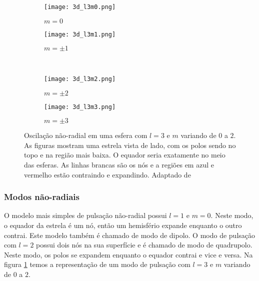 \begin{figure}[!ht]
\centering
\begin{subfigure}{.5\textwidth}
  \centering
  \texttt{[image: 3d\_l3m0.png]}
  \caption{$m = 0$}

\end{subfigure}%
\begin{subfigure}{.5\textwidth}
  \centering
  \texttt{[image: 3d\_l3m1.png]}
  \caption{$m = \pm 1$}
\end{subfigure}
\\
\begin{subfigure}{.5\textwidth}
  \centering
  \texttt{[image: 3d\_l3m2.png]}
  \caption{$m = \pm 2$}

\end{subfigure}%
\begin{subfigure}{.5\textwidth}
  \centering
  \texttt{[image: 3d\_l3m3.png]}
  \caption{$m = \pm 3$}
\end{subfigure}
\caption[Oscilação não-radial em uma esfera.]{Oscilação não-radial em uma esfera com $l=3$ e $ m$ variando de $0$ a $2$. As figuras mostram uma estrela vista de lado, com os polos sendo no topo e na região mais baixa. O equador seria exatamente no meio das esferas. As linhas brancas são os nós e a regiões em azul e vermelho estão contraindo e expandindo. Adaptado de \citet{astroseis}}
\label{fig:esfera_naoradial}
\end{figure}


\subsubsection{Modos não-radiais}

O modelo mais simples de pulsação não-radial possui $l=1$ e $ m=0 $. Neste modo, o equador da estrela é um nó, então um hemisfério expande enquanto o outro contrai. Este modelo também é chamado de modo de dipolo. O modo de pulsação com $ l=2$ possui dois nós na sua superfície e é chamado de modo de quadrupolo. Neste modo, os polos se expandem enquanto o equador contrai e vice e versa.
Na figura \ref{fig:esfera_naoradial} temos a representação de um modo de pulsação com $l=3$ e $m$ variando de $0$ a $2$.







